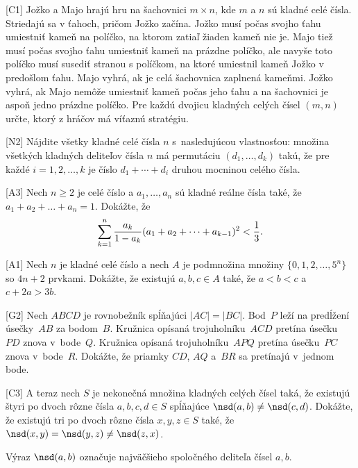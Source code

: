{%
[C1]
Jožko a Majo hrajú hru na šachovnici $m\times n$, kde $m$ a $n$ sú kladné celé čísla. Striedajú sa v ťahoch, pričom Jožko začína. Jožko musí počas svojho ťahu umiestniť kameň na políčko, na ktorom zatiaľ žiaden kameň nie je. Majo tiež musí počas svojho ťahu umiestniť kameň na prázdne políčko, ale navyše toto  políčko musí susediť stranou s políčkom, na ktoré umiestnil kameň Jožko v predošlom ťahu.
\smallskip
Majo vyhrá, ak je celá šachovnica zaplnená kameňmi. Jožko vyhrá, ak Majo nemôže umiestniť kameň počas jeho ťahu a na šachovnici je aspoň jedno prázdne políčko.
Pre každú dvojicu kladných celých čísel $(m,n)$ určte, ktorý z hráčov má víťaznú stratégiu.}

{%
[N2]
Nájdite všetky kladné celé čísla $n$ s~nasledujúcou vlastnosťou: množina všetkých kladných deliteľov čísla $n$ má permutáciu $(d_1,\dots,d_k)$ takú, že pre každé $i=1,2,\dots,k$ je číslo $d_1+\cdots+d_i$ druhou mocninou celého čísla.}

{%
[A3]
Nech $n\ge 2$ je celé číslo a $a_1,\dots,a_n$ sú kladné reálne čísla také, že $a_1+a_2+\dots+a_n=1$. Dokážte, že
$$
\sum_{k=1}^n\frac{a_k}{1-a_k}(a_1+a_2+\dots+a_{k-1})^2<\frac 13.
\belowdisplayskip0pt
$$}

{%
[A1]
Nech $n$ je kladné celé číslo a nech $A$ je podmnožina množiny $\{0,1,2,\dots,5^n\}$ so $4n+2$ prvkami. Dokážte, že existujú $a,b,c\in A$ také, že $a<b<c$ a $c+2a>3b$.}

{%
[G2]
Nech $ABCD$ je rovnobežník spĺňajúci $|AC|=|BC|$. Bod~$P$ leží na predĺžení úsečky~$AB$ za bodom~$B$. Kružnica opísaná trojuholníku~$ACD$ pretína úsečku~$PD$ znova v~bode~$Q$. Kružnica opísaná trojuholníku~$APQ$ pretína úsečku~$PC$ znova v~bode~$R$. Dokážte, že priamky $CD$, $AQ$ a~$BR$ sa pretínajú v~jednom bode.}

{%
[C3]
A teraz nech $S$ je nekonečná množina kladných celých čísel taká, že existujú štyri po dvoch rôzne čísla $a,b,c,d\in S$ spĺňajúce $\nsd(a,b)\ne \nsd(c,d)$. Dokážte, že existujú tri po dvoch rôzne čísla $x,y,z\in S$ také, že $\nsd(x,y)=\nsd(y,z)\ne \nsd(z,x)$.

\poznamka
Výraz $\nsd(a,b)$ označuje najväčšieho spoločného deliteľa čísel $a,b$.
}

